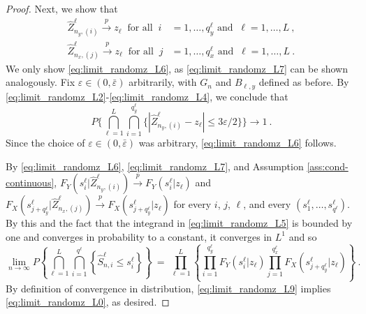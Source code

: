 \documentclass[10pt,a4paper]{amsart}
\begin{document}
\begin{proof}
  Next, we show that
  \begin{align}
  \hat Z_{n_{y},\left(i\right)}^{\ell}\overset{p}{\rightarrow}z_{\ell}~\text{ for all }~
  i&=1,\dots,q_{y}^{\ell}\text{ and }~\ell=1,\ldots,L~,\label{eq:limit_randomz_L6}\\
  \hat Z_{n_{x},\left(j\right)}^{\ell}\overset{p}{\rightarrow}z_{\ell}~\text{ for all }~
  j&=1,\dots,q_{x}^{\ell}\text{ and }~\ell=1,\ldots,L~.\label{eq:limit_randomz_L7}
  \end{align}
  We only show \eqref{eq:limit_randomz_L6}, as \eqref{eq:limit_randomz_L7} can be shown analogously. Fix $\varepsilon\in(0,\bar\varepsilon)$ arbitrarily, with $G_n$ and $B_{\ell,y}$ defined as before. By \eqref{eq:limit_randomz_L2}-\eqref{eq:limit_randomz_L4}, we conclude that
  \begin{equation*}
  P\Big\{\bigcap_{\ell=1}^{L}\bigcap_{i=1}^{q_y^\ell}
  \{|\hat Z_{n_{y},\left(i\right)}^{\ell}-z_{\ell}|\leq 3\varepsilon/2\}\Big\}\rightarrow 1~.
  \end{equation*}
  Since the choice of $\varepsilon\in(0,\bar\varepsilon)$ was arbitrary, \eqref{eq:limit_randomz_L6} follows.

  By \eqref{eq:limit_randomz_L6}, \eqref{eq:limit_randomz_L7}, and Assumption \ref{ass:cond-continuous}, $F_{Y}(s_{i}^{\ell}|\hat Z_{n_{y},(i)}^{\ell})\overset{p}{\rightarrow} F_{Y}(s_{i}^{\ell}|z_{\ell})$ and $F_{X}(s_{j+q_{y}^{\ell}}^{\ell}|\hat Z_{n_{x},(j)}^{\ell})\overset{p}{\rightarrow} F_{X}(s_{j+q_{y}^{\ell}}^{\ell}|z_{\ell})$ for every $i$, $j$, $\ell$, and every $(s_{1}^{\ell},\dots,s_{q^{\ell}}^{\ell})$. By this and the fact that the integrand in \eqref{eq:limit_randomz_L5} is bounded by one and converges in probability to a constant, it converges in $L^1$ and so 
  \begin{equation}
  \lim_{n\rightarrow\infty}P\left\{\bigcap_{\ell=1}^{L}\bigcap_{i=1}^{q^{\ell}}\left\{
  \hat S_{n,i}^{\ell}\leq s_{i}^{\ell}\right\}\right\}~
  =~\prod_{\ell=1}^{L}\left\{
  \prod_{i=1}^{q_{y}^{\ell}}F_{Y}(s_{i}^{\ell}|z_{\ell})\prod_{j=1}^{q_{x}^{\ell}}
  F_{X}(s_{j+q_{y}^{\ell}}^{\ell}|z_{\ell})\right\}~.
  \label{eq:limit_randomz_L9}
  \end{equation}
  By definition of convergence in distribution, \eqref{eq:limit_randomz_L9} implies \eqref{eq:limit_randomz_L0}, as desired.
\end{proof}
\end{document}
